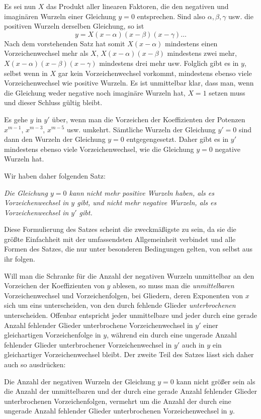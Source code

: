 Es sei nun $X$ das Produkt aller linearen Faktoren, die den negativen und imaginären Wurzeln einer Gleichung $y=0$ entsprechen. Sind also $\alpha,\beta,\gamma$ usw. die positiven Wurzeln derselben Gleichung, so ist
\[
y=X(x-\alpha)(x-\beta)(x-\gamma)\ldots
\]
Nach dem vorstehenden Satz hat somit $X(x-\alpha)$ mindestens einen Vorzeichenwechsel mehr als $X$, $X(x-\alpha)(x-\beta)$ mindestens zwei mehr, $X(x-\alpha)(x-\beta)(x-\gamma)$ mindestens drei mehr usw. Folglich gibt es in $y$, selbst wenn in $X$ gar kein Vorzeichenwechsel vorkommt, mindestens ebenso viele Vorzeichenwechsel wie positive Wurzeln. Es ist unmittelbar klar, dass man, wenn die Gleichung weder negative noch imaginäre Wurzeln hat, $X=1$ setzen muss und dieser Schluss gültig bleibt.

Es gehe $y$ in $y'$ über, wenn man die Vorzeichen der Koeffizienten der Potenzen $x^{m-1}$, $x^{m-3}$, $x^{m-5}$ usw. umkehrt. Sämtliche Wurzeln der Gleichung $y'=0$ sind dann den Wurzeln der Gleichung $y=0$ entgegengesetzt. Daher gibt es in $y'$ mindestens ebenso viele Vorzeichenwechsel, wie die Gleichung $y=0$ negative Wurzeln hat.
\par
{}
Wir haben daher folgenden Satz:

\emph{Die Gleichung $y=0$ kann nicht mehr positive Wurzeln haben, als es Vorzeichenwechsel in $y$ gibt, und nicht mehr negative Wurzeln, als es Vorzeichenwechsel in $y'$ gibt.}

Diese Formulierung des Satzes scheint die zweckmäßigste zu sein, da sie die größte Einfachheit mit der umfassendsten Allgemeinheit verbindet und alle Formen des Satzes, die nur unter besonderen Bedingungen gelten, von selbst aus ihr folgen.

Will man die Schranke für die Anzahl der negativen Wurzeln unmittelbar an den Vorzeichen der Koeffizienten von $y$ ablesen, so muss man die \emph{unmittelbaren} Vorzeichenwechsel und Vorzeichenfolgen, bei Gliedern, deren Exponenten von $x$ sich um eins unterscheiden, von den durch fehlende Glieder \emph{unterbrochenen} unterscheiden. Offenbar entspricht jeder unmittelbare und jeder durch eine gerade Anzahl fehlender Glieder unterbrochene Vorzeichenwechsel in $y'$ einer gleichartigen Vorzeichenfolge in $y$, während ein durch eine ungerade Anzahl fehlender Glieder unterbrochener Vorzeichenwechsel in $y'$ auch in $y$ ein gleichartiger Vorzeichenwechsel bleibt. Der zweite Teil des Satzes lässt sich daher auch so ausdrücken:

Die Anzahl der negativen Wurzeln der Gleichung $y=0$ kann nicht größer sein als die Anzahl der unmittelbaren und der durch eine gerade Anzahl fehlender Glieder unterbrochenen Vorzeichenfolgen, vermehrt um die Anzahl der durch eine ungerade Anzahl fehlender Glieder unterbrochenen Vorzeichenwechsel in $y$.

